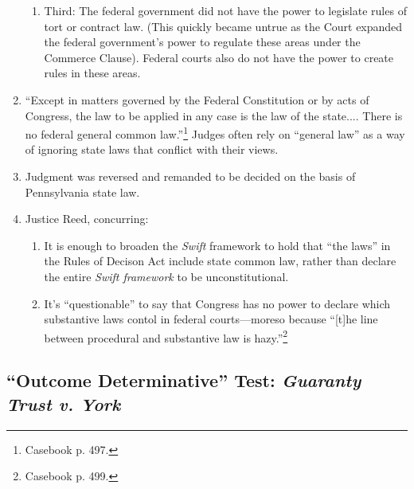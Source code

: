 \begin{enumerate}
\begin{enumerate}
        \item Third: The federal government did not have the power to legislate rules of tort or contract law. (This quickly became untrue as the Court expanded the federal government's power to regulate these areas under the Commerce Clause). Federal courts also do not have the power to create rules in these areas.
    \end{enumerate}
    \item ``Except in matters governed by the Federal Constitution or by acts of Congress, the law to be applied in any case is the law of the state.... There is no federal general common law.''\footnote{Casebook p. 497.} Judges often rely on ``general law'' as a way of ignoring state laws that conflict with their views.
    \item Judgment was reversed and remanded to be decided on the basis of Pennsylvania state law.
    \item Justice Reed, concurring:
    \begin{enumerate}
        \item It is enough to broaden the \emph{Swift} framework to hold that ``the laws'' in the Rules of Decison Act include state common law, rather than declare the entire \emph{Swift framework} to be unconstitutional.
        \item It's ``questionable'' to say that Congress has no power to declare which substantive laws contol in federal courts---moreso because ``[t]he line between procedural and substantive law is hazy.''\footnote{Casebook p. 499.}
    \end{enumerate}
\end{enumerate}

\subsection{``Outcome Determinative'' Test: \emph{Guaranty Trust v. York}}

